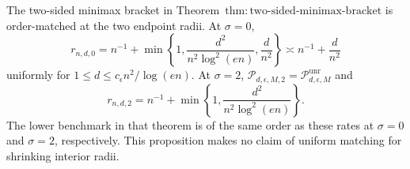 The two-sided minimax bracket in Theorem~\(\mathrm{thm:two\text{-}sided\text{-}minimax\text{-}bracket}\) is order-matched at the two endpoint radii.  At \(\sigma=0\),
\[
 r_{n,d,0}=n^{-1}+\min\left\{1,\frac{d^2}{n^2\log^2(en)},\frac d{n^2}\right\}
 \asymp n^{-1}+\frac d{n^2}
\]
uniformly for \(1\le d\le c_{\epsilon}n^2/\log(en)\).  At \(\sigma=2\),
\(\mathcal P_{d,\epsilon,M,2}=\mathcal P_{d,\epsilon,M}^{\mathrm{unr}}\) and
\[
 r_{n,d,2}=n^{-1}+\min\left\{1,\frac{d^2}{n^2\log^2(en)}\right\}.
\]
The lower benchmark in that theorem is of the same order as these rates at \(\sigma=0\) and \(\sigma=2\), respectively.  This proposition makes no claim of uniform matching for shrinking interior radii.